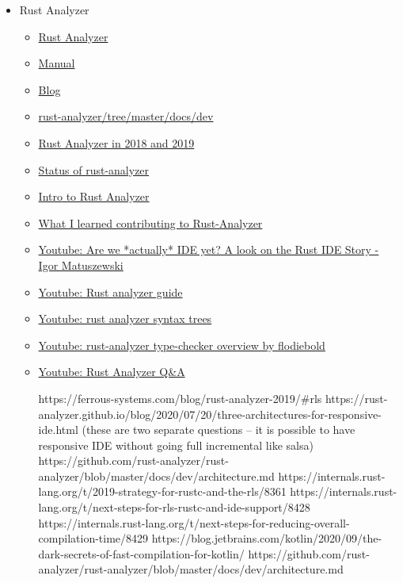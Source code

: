 \documentclass[12pt, a4paper]{report}
\begin{document}
\begin{itemize}[noitemsep]
  \item Rust Analyzer
    \begin{itemize}[noitemsep]
    \item \href{https://rust-analyzer.github.io/}{\Square Rust Analyzer}
    \item \href{https://rust-analyzer.github.io/manual.html}{\Square Manual}
    \item \href{https://rust-analyzer.github.io/blog}{\Square Blog}
    \item \href{https://github.com/rust-analyzer/rust-analyzer/tree/master/docs/dev}{\Square rust-analyzer/tree/master/docs/dev}
    \item \href{https://ferrous-systems.com/blog/rust-analyzer-2019/}{\Square Rust Analyzer in 2018 and 2019}
    \item \href{https://ferrous-systems.com/blog/rust-analyzer-status-opencollective/}{\Square Status of rust-analyzer}
    \item \href{https://blog.logrocket.com/intro-to-rust-analyzer/}{ Intro to Rust Analyzer}
    \item \href{https://dev.to/bnjjj/what-i-learned-contributing-to-rust-analyzer-4c7e}{ What I learned contributing to Rust-Analyzer}
    \item \href{https://www.youtube.com/watch?v=7_7ckOKZCJE}{\Square Youtube: Are we *actually* IDE yet? A look on the Rust IDE Story - Igor Matuszewski}
    \item \href{https://www.youtube.com/watch?v=ANKBNiSWyfc}{\Square Youtube: Rust analyzer guide}
    \item \href{https://www.youtube.com/watch?v=DGAuLWdCCAI}{\Square Youtube: rust analyzer syntax trees}
    \item \href{https://www.youtube.com/watch?v=Lmp3P9WNL8o}{\Square Youtube: rust-analyzer type-checker overview by flodiebold}
    \item \href{https://www.youtube.com/playlist?list=PLXajQV_H-DxLMBt0amcuxgTeOTj6L-YGl}{\Square Youtube: Rust Analyzer Q\&A}

    https://ferrous-systems.com/blog/rust-analyzer-2019/#rls
    https://rust-analyzer.github.io/blog/2020/07/20/three-architectures-for-responsive-ide.html
    (these are two separate questions -- it is possible to have responsive IDE without going full incremental like salsa)
    https://github.com/rust-analyzer/rust-analyzer/blob/master/docs/dev/architecture.md
    https://internals.rust-lang.org/t/2019-strategy-for-rustc-and-the-rls/8361
    https://internals.rust-lang.org/t/next-steps-for-rls-rustc-and-ide-support/8428
    https://internals.rust-lang.org/t/next-steps-for-reducing-overall-compilation-time/8429
    https://blog.jetbrains.com/kotlin/2020/09/the-dark-secrets-of-fast-compilation-for-kotlin/
    https://github.com/rust-analyzer/rust-analyzer/blob/master/docs/dev/architecture.md
    \end{itemize}


\end{itemize}
\end{document}
